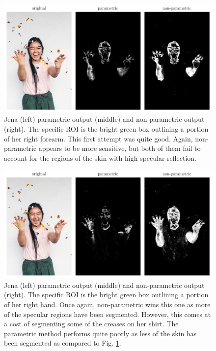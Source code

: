 \documentclass[12pt,a4paper]{article}
\begin{document}
\begin{figure}[htb]
	\centering
	\includegraphics[width=\textwidth]{jena_arm_out.png}
	\caption{Jena (left) parametric output (middle) and non-parametric output (right). The specific ROI is the bright green box outlining a portion of her right forearm. This first attempt was quite good. Again, non-parametric appears to be more sensitive, but both of them fail to account for the regions of the skin with high specular reflection.}
	\label{fig:jena-arm}
\end{figure}

\begin{figure}[htb]
	\centering
	\includegraphics[width=\textwidth]{jena_hand_out.png}
	\caption{Jena (left) parametric output (middle) and non-parametric output (right). The specific ROI is the bright green box outlining a portion of her right hand. Once again, non-parametric wins this one as more of the specular regions have been segmented. However, this comes at a cost of segmenting some of the creases on her shirt. The parametric method performs quite poorly as less of the skin has been segmented as compared to Fig. \ref{fig:jena-arm}.}
	\label{fig:jena-hand}
\end{figure}
\end{document}
